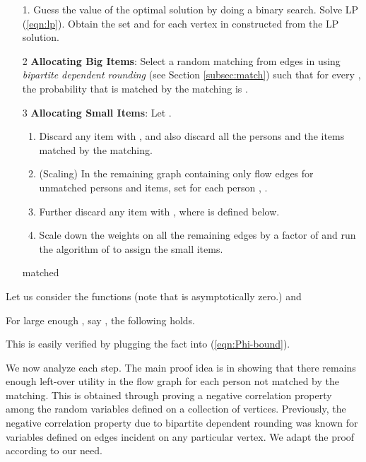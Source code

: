 \begin{enumerate}
\item[1.] Guess the value of the optimal solution  by doing a binary search. Solve LP (\ref{eqn:lp}).
  Obtain the set  and  for each vertex  in  constructed from the LP solution.

  \bigskip

\item[2] {\bf Allocating Big Items}: Select a random matching from edges in  using { \em bipartite dependent rounding}
(see Section \ref{subsec:match}) such that for every , the probability that  is matched by the matching is .

\bigskip

\item[3] {\bf Allocating Small Items}: Let .
\begin{enumerate}
\item Discard any item  with , and also discard all the persons and the items matched by the matching.
\item (Scaling) In the remaining graph containing only flow edges for unmatched persons and items, set for each
person , .
\item Further discard any item   with , where  is defined below.
\item Scale down the weights on all the remaining edges by a factor of  and run the algorithm of \cite{dani:05} to assign the small items.
\end{enumerate}

matched
\end{enumerate}




Let us consider the functions  (note that
 is asymptotically zero.) and

For large enough , say , the following holds.

 This is easily verified by plugging the fact  into (\ref{eqn:Phi-bound}).

\bigskip


We now analyze each step. The main proof idea is in showing that there remains enough left-over utility in the flow graph for each person
not matched by the matching. This is obtained through proving a negative correlation property among the random variables
defined on a collection of vertices. Previously, the negative correlation property due to bipartite dependent
rounding was known for variables defined on edges incident on any particular vertex. We adapt the proof according to our need.

